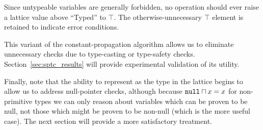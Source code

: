 \documentclass[12pt,titlepage,twoside]{article}
\newcommand{\meet}{\ensuremath{\sqcap}}
\begin{document}
Since untypeable variables are generally forbidden, no operation
should ever raise a lattice value above ``Typed'' to $\top$.  The
otherwise-unnecessary $\top$ element is retained to indicate error
conditions.

This variant of the constant-propagation algorithm allows us to
eliminate unnecessary  checks due to type-casting or
type-safety checks.  Section~\ref{sec:sptc_results} will provide
experimental validation of its utility.

Finally, note that the ability to represent  as the
 type in the lattice begins to allow us to address
null-pointer checks, although because $\code{null} \meet x =x$ for
non-primitive types we can only reason about variables which can be
proven to be null, not those which might be proven to be non-null
(which is the more useful case).  The next section will provide a more
satisfactory treatment.
\end{document}
